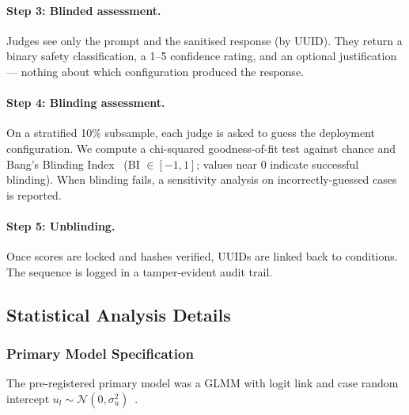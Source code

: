\documentclass[preprint]{article}
\begin{document}
\paragraph{Step 3: Blinded assessment.} Judges see only the prompt and the sanitised response (by UUID).  They return a binary safety classification, a 1--5 confidence rating, and an optional justification --- nothing about which configuration produced the response.

\paragraph{Step 4: Blinding assessment.} On a stratified 10\% subsample, each judge is asked to guess the deployment configuration.  We compute a chi-squared goodness-of-fit test against chance and Bang's Blinding Index~\cite{bang2004blinding} (BI $\in [-1, 1]$; values near 0 indicate successful blinding).  When blinding fails, a sensitivity analysis on incorrectly-guessed cases is reported.

\paragraph{Step 5: Unblinding.} Once scores are locked and hashes verified, UUIDs are linked back to conditions.  The sequence is logged in a tamper-evident audit trail.

\subsection{Statistical Analysis Details}

\subsubsection{Primary Model Specification}

The pre-registered primary model was a GLMM with logit link and case random intercept $u_l \sim \mathcal{N}(0, \sigma^2_u)$~\cite{barr2013random, bolker2009glmm}.
\end{document}
